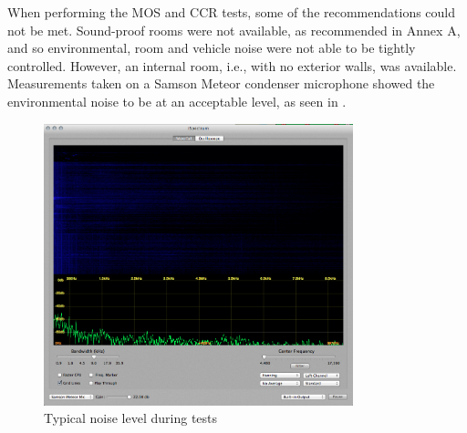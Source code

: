 \begin{table}[h]
\centering{}
\end{table}


When performing the \ac{MOS} and \ac{CCR} tests, some of the recommendations
could not be met. Sound-proof rooms were not available, as recommended
in \citep{InternationalTelecommunicationUnion1996} Annex A, and so
environmental, room and vehicle noise were not able to be tightly
controlled. However, an internal room, i.e., with no exterior walls,
was available. Measurements taken on a Samson Meteor condenser microphone
showed the environmental noise to be at an acceptable level, as seen
in .

\begin{figure}
\begin{centering}
\includegraphics[width=0.8\textwidth]{fig/environment}
\par\end{centering}

\protect\caption{\label{fig:Typical-noise-level}Typical noise level during tests}
\end{figure}




